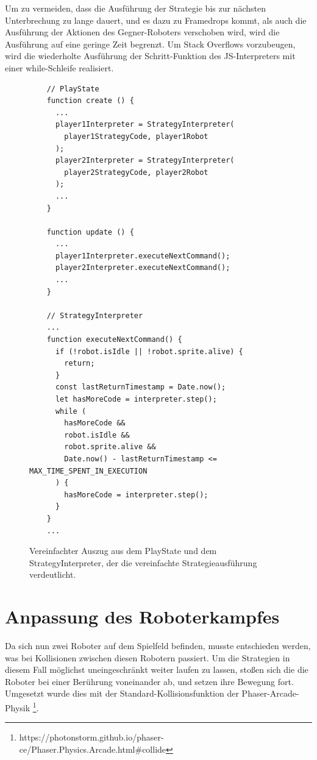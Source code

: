 Um zu vermeiden, dass die Ausführung der Strategie bis zur nächsten Unterbrechung zu lange dauert,
und es dazu zu Framedrops kommt, als auch die Ausführung der Aktionen des Gegner-Roboters verschoben
wird, wird die Ausführung auf eine geringe Zeit begrenzt. Um Stack Overflows vorzubeugen, wird die
wiederholte Ausführung der Schritt-Funktion des JS-Interpreters mit einer while-Schleife realisiert.


\begin{figure}
  \begin{lstlisting}
    // PlayState
    function create () {
      ...
      player1Interpreter = StrategyInterpreter(
        player1StrategyCode, player1Robot
      );
      player2Interpreter = StrategyInterpreter(
        player2StrategyCode, player2Robot
      );
      ...
    }

    function update () {
      ...
      player1Interpreter.executeNextCommand();
      player2Interpreter.executeNextCommand();
      ...
    }

    // StrategyInterpreter
    ...
    function executeNextCommand() {
      if (!robot.isIdle || !robot.sprite.alive) {
        return;
      }
      const lastReturnTimestamp = Date.now();
      let hasMoreCode = interpreter.step();
      while (
        hasMoreCode &&
        robot.isIdle &&
        robot.sprite.alive &&
        Date.now() - lastReturnTimestamp <= MAX_TIME_SPENT_IN_EXECUTION
      ) {
        hasMoreCode = interpreter.step();
      }
    }
    ...
  \end{lstlisting}

  \caption{Vereinfachter Auszug aus dem PlayState und dem StrategyInterpreter, der die vereinfachte
  Strategieausführung verdeutlicht.}

  \label{strategy-interpreter-new}
\end{figure}


\section{Anpassung des Roboterkampfes}

Da sich nun zwei Roboter auf dem Spielfeld befinden, musste entschieden werden, was bei Kollisionen
zwischen diesen Robotern passiert. Um die Strategien in diesem Fall möglichst uneingeschränkt weiter
laufen zu lassen, stoßen sich die die Roboter bei einer Berührung voneinander ab, und setzen ihre
Bewegung fort. Umgesetzt wurde dies mit der Standard-Kollisionsfunktion der Phaser-Arcade-Physik
\footnote{https://photonstorm.github.io/phaser-ce/Phaser.Physics.Arcade.html\#collide}.

